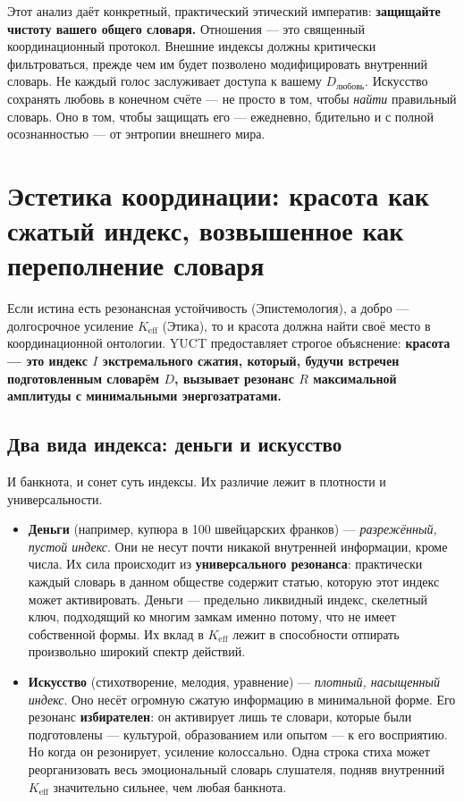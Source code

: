 \documentclass[12pt,a4paper]{article}
\begin{document}
	Этот анализ даёт конкретный, практический этический императив: \textbf{защищайте чистоту вашего общего словаря.} Отношения — это священный координационный протокол. Внешние индексы должны критически фильтроваться, прежде чем им будет позволено модифицировать внутренний словарь. Не каждый голос заслуживает доступа к вашему \(D_{\text{любовь}}\). Искусство сохранять любовь в конечном счёте — не просто в том, чтобы \emph{найти} правильный словарь. Оно в том, чтобы защищать его — ежедневно, бдительно и с полной осознанностью — от энтропии внешнего мира.
	
	\section{Эстетика координации: красота как сжатый индекс, возвышенное как переполнение словаря}
	\label{sec:coordination-aesthetics}
	
	Если истина есть резонансная устойчивость (Эпистемология), а добро — долгосрочное усиление \(K_{\mathrm{eff}}\) (Этика), то и красота должна найти своё место в координационной онтологии. YUCT предоставляет строгое объяснение: \textbf{красота — это индекс \(I\) экстремального сжатия, который, будучи встречен подготовленным словарём \(D\), вызывает резонанс \(R\) максимальной амплитуды с минимальными энергозатратами.}
	
	\subsection{Два вида индекса: деньги и искусство}
	
	И банкнота, и сонет суть индексы. Их различие лежит в плотности и универсальности.
	
	\begin{itemize}[leftmargin=*]
		\item \textbf{Деньги} (например, купюра в 100 швейцарских франков) — \emph{разрежённый, пустой индекс}. Они не несут почти никакой внутренней информации, кроме числа. Их сила происходит из \textbf{универсального резонанса}: практически каждый словарь в данном обществе содержит статью, которую этот индекс может активировать. Деньги — предельно ликвидный индекс, скелетный ключ, подходящий ко многим замкам именно потому, что не имеет собственной формы. Их вклад в \(K_{\mathrm{eff}}\) лежит в способности отпирать произвольно широкий спектр действий.
		\item \textbf{Искусство} (стихотворение, мелодия, уравнение) — \emph{плотный, насыщенный индекс}. Оно несёт огромную сжатую информацию в минимальной форме. Его резонанс \textbf{избирателен}: он активирует лишь те словари, которые были подготовлены — культурой, образованием или опытом — к его восприятию. Но когда он резонирует, усиление колоссально. Одна строка стиха может реорганизовать весь эмоциональный словарь слушателя, подняв внутренний \(K_{\mathrm{eff}}\) значительно сильнее, чем любая банкнота.
	\end{itemize}
	
\end{document}
